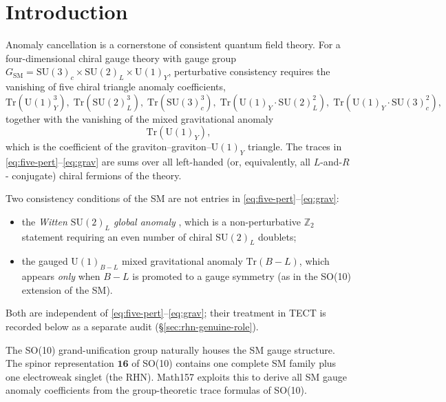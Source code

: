 \section{Introduction}\label{sec:intro}
Anomaly cancellation is a cornerstone of consistent quantum field
theory. For a four-dimensional chiral gauge theory with gauge group
$G_{\mathrm{SM}}=\mathrm{SU}(3)_c\times\mathrm{SU}(2)_L\times
\mathrm{U}(1)_Y$, perturbative consistency requires the vanishing of
five chiral triangle anomaly coefficients,
\begin{equation}\label{eq:five-pert}
  \mathrm{Tr}(\mathrm{U}(1)_Y^3),\;
  \mathrm{Tr}(\mathrm{SU}(2)_L^3),\;
  \mathrm{Tr}(\mathrm{SU}(3)_c^3),\;
  \mathrm{Tr}(\mathrm{U}(1)_Y\cdot \mathrm{SU}(2)_L^2),\;
  \mathrm{Tr}(\mathrm{U}(1)_Y\cdot \mathrm{SU}(3)_c^2),
\end{equation}
together with the vanishing of the mixed gravitational anomaly
\begin{equation}\label{eq:grav}
  \mathrm{Tr}(\mathrm{U}(1)_Y),
\end{equation}
which is the coefficient of the graviton--graviton--$\mathrm{U}(1)_Y$
triangle. The traces in \eqref{eq:five-pert}--\eqref{eq:grav} are
sums over all left-handed (or, equivalently, all $L$-and-$R$-
conjugate) chiral fermions of the theory.

Two consistency conditions of the SM are not entries in
\eqref{eq:five-pert}--\eqref{eq:grav}:
\begin{itemize}
  \item the \emph{Witten $\mathrm{SU}(2)_L$ global anomaly}
    \cite{Witten1982}, which is a non-perturbative
    $\mathbb{Z}_2$ statement requiring an even number of chiral
    $\mathrm{SU}(2)_L$ doublets;
  \item the gauged $\mathrm{U}(1)_{B-L}$ mixed gravitational anomaly
    $\mathrm{Tr}(B-L)$, which appears \emph{only} when $B-L$ is
    promoted to a gauge symmetry (as in the SO(10) extension of the
    SM).
\end{itemize}
Both are independent of \eqref{eq:five-pert}--\eqref{eq:grav}; their
treatment in TECT is recorded below as a separate audit
(\S\ref{sec:rhn-genuine-role}).

The SO(10) grand-unification group naturally houses the SM gauge
structure. The spinor representation $\mathbf{16}$ of SO(10) contains
one complete SM family plus one electroweak singlet (the RHN).
Math157 exploits this to derive all SM gauge anomaly coefficients from
the group-theoretic trace formulas of SO(10).

